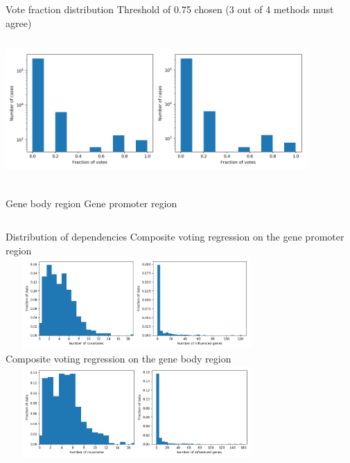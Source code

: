 \documentclass{beamer}
\begin{document}
\begin{frame}{Vote fraction distribution}
Threshold of 0.75 chosen (3 out of 4 methods must agree)\\~\\
\includegraphics[width=11.5cm,height=5cm]{mappings/vote_distribution}\\
\begin{small}
	\begin{columns}[t]
		\centering
		Gene body region
		\centering
		Gene promoter region
	\end{columns}
\end{small}
\end{frame}



\begin{frame}{Distribution of dependencies}
Composite voting regression on the gene promoter region\\
\includegraphics[width=10cm,height=3.5cm]{mappings/distributions/Composite_Prom}\\
Composite voting regression on the gene body region\\
\includegraphics[width=10cm,height=3.5cm]{mappings/distributions/Composite_Body}\\
\end{frame}
\end{document}
